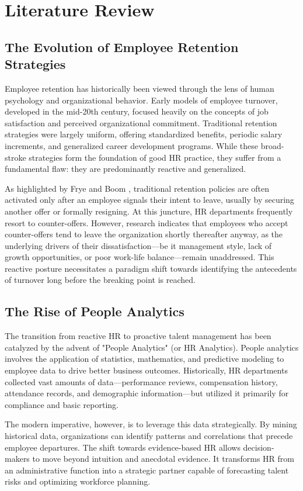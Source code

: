 \chapter{Literature Review}

\section{The Evolution of Employee Retention Strategies}
Employee retention has historically been viewed through the lens of human psychology and organizational behavior. Early models of employee turnover, developed in the mid-20th century, focused heavily on the concepts of job satisfaction and perceived organizational commitment. Traditional retention strategies were largely uniform, offering standardized benefits, periodic salary increments, and generalized career development programs. While these broad-stroke strategies form the foundation of good HR practice, they suffer from a fundamental flaw: they are predominantly reactive and generalized.

As highlighted by Frye and Boom \cite{frye2018employee}, traditional retention policies are often activated only after an employee signals their intent to leave, usually by securing another offer or formally resigning. At this juncture, HR departments frequently resort to counter-offers. However, research indicates that employees who accept counter-offers tend to leave the organization shortly thereafter anyway, as the underlying drivers of their dissatisfaction—be it management style, lack of growth opportunities, or poor work-life balance—remain unaddressed. This reactive posture necessitates a paradigm shift towards identifying the antecedents of turnover long before the breaking point is reached.

\section{The Rise of People Analytics}
The transition from reactive HR to proactive talent management has been catalyzed by the advent of "People Analytics" (or HR Analytics). People analytics involves the application of statistics, mathematics, and predictive modeling to employee data to drive better business outcomes. Historically, HR departments collected vast amounts of data—performance reviews, compensation history, attendance records, and demographic information—but utilized it primarily for compliance and basic reporting.

The modern imperative, however, is to leverage this data strategically. By mining historical data, organizations can identify patterns and correlations that precede employee departures. The shift towards evidence-based HR allows decision-makers to move beyond intuition and anecdotal evidence. It transforms HR from an administrative function into a strategic partner capable of forecasting talent risks and optimizing workforce planning.

